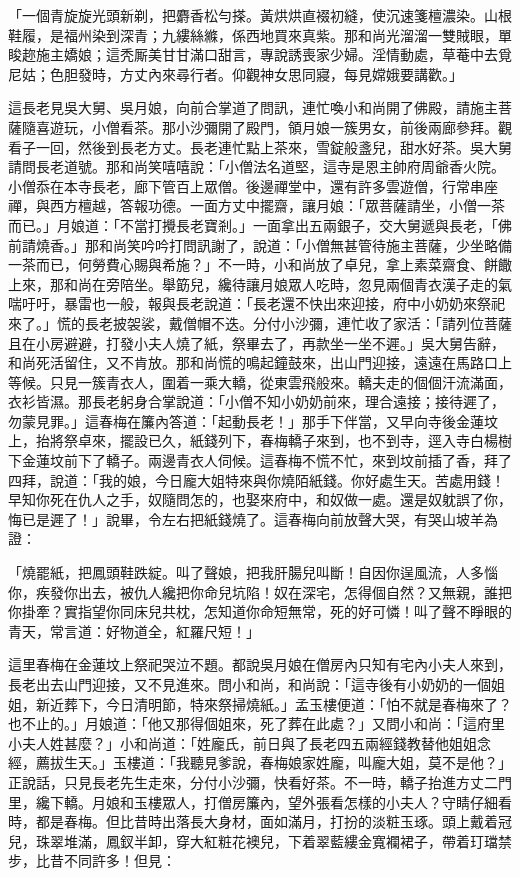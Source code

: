「一個青旋旋光頭新剃，把麝香松勻搽。黃烘烘直裰初縫，使沉速箋檀濃染。山根鞋履，是福州染到深青；九縷絲縧，係西地買來真紫。那和尚光溜溜一雙賊眼，單睃趂施主嬌娘；這秃厮美甘甘滿口甜言，專說誘喪家少婦。淫情動處，草菴中去覓尼姑；色胆發時，方丈內來尋行者。仰觀神女思同寢，每見嫦娥要講歡。」

這長老見吳大舅、吳月娘，向前合掌道了問訊，連忙喚小和尚開了佛殿，請施主菩薩隨喜遊玩，小僧看茶。那小沙彌開了殿門，領月娘一簇男女，前後兩廊參拜。觀看子一回，然後到長老方丈。長老連忙點上茶來，雪錠般盞兒，甜水好茶。吳大舅請問長老道號。那和尚笑嘻嘻說：「小僧法名道堅，這寺是恩主帥府周爺香火院。小僧忝在本寺長老，廊下管百上眾僧。後邊禪堂中，還有許多雲遊僧，行常串座禪，與西方檀越，答報功德。一面方丈中擺齋，讓月娘：「眾菩薩請坐，小僧一茶而已。」月娘道：「不當打攪長老寶剎。」一面拿出五兩銀子，交大舅遞與長老，「佛前請燒香。」那和尚笑吟吟打問訊謝了，說道：「小僧無甚管待施主菩薩，少坐略備一茶而已，何勞費心賜與希施？」不一時，小和尚放了卓兒，拿上素菜齋食、餅饊上來，那和尚在旁陪坐。舉筯兒，纔待讓月娘眾人吃時，忽見兩個青衣漢子走的氣喘吁吁，暴雷也一般，報與長老說道：「長老還不快出來迎接，府中小奶奶來祭祀來了。」慌的長老披袈裟，戴僧帽不迭。分付小沙彌，連忙收了家活：「請列位菩薩且在小房避避，打發小夫人燒了紙，祭畢去了，再款坐一坐不遲。」吳大舅告辭，和尚死活留住，又不肯放。那和尚慌的鳴起鐘鼓來，出山門迎接，遠遠在馬路口上等候。只見一簇青衣人，圍着一乘大轎，從東雲飛般來。轎夫走的個個汗流滿面，衣衫皆濕。那長老躬身合掌說道：「小僧不知小奶奶前來，理合遠接；接待遲了，勿蒙見罪。」這春梅在簾內答道：「起動長老！」那手下伴當，又早向寺後金蓮坟上，抬將祭卓來，擺設已久，紙錢列下，春梅轎子來到，也不到寺，逕入寺白楊樹下金蓮坟前下了轎子。兩邊青衣人伺候。這春梅不慌不忙，來到坟前插了香，拜了四拜，說道：「我的娘，今日龐大姐特來與你燒陌紙錢。你好處生天。苦處用錢！早知你死在仇人之手，奴隨問怎的，也娶來府中，和奴做一處。還是奴躭誤了你，悔已是遲了！」說畢，令左右把紙錢燒了。這春梅向前放聲大哭，有哭山坡羊為證：

「燒罷紙，把鳳頭鞋跌綻。叫了聲娘，把我肝腸兒叫斷！自因你逞風流，人多惱你，疾發你出去，被仇人纔把你命兒坑陷！奴在深宅，怎得個自然？又無親，誰把你掛牽？實指望你同床兒共枕，怎知道你命短無常，死的好可憐！叫了聲不睜眼的青天，常言道：好物道全，紅羅尺短！」

這里春梅在金蓮坟上祭祀哭泣不題。都說吳月娘在僧房內只知有宅內小夫人來到，長老出去山門迎接，又不見進來。問小和尚，和尚說：「這寺後有小奶奶的一個姐姐，新近葬下，今日清明節，特來祭掃燒紙。」孟玉樓便道：「怕不就是春梅來了？也不止的。」月娘道：「他又那得個姐來，死了葬在此處？」又問小和尚：「這府里小夫人姓甚麼？」小和尚道：「姓龐氏，前日與了長老四五兩經錢教替他姐姐念經，薦拔生天。」玉樓道：「我聽見爹說，春梅娘家姓龐，叫龐大姐，莫不是他？」正說話，只見長老先生走來，分付小沙彌，快看好茶。不一時，轎子抬進方丈二門里，纔下轎。月娘和玉樓眾人，打僧房簾內，望外張看怎樣的小夫人？守睛仔細看時，都是春梅。但比昔時出落長大身材，面如滿月，打扮的淡粧玉琢。頭上戴着冠兒，珠翠堆滿，鳳釵半卸，穿大紅粧花襖兒，下着翠藍縷金寬襴裙子，帶着玎璫禁步，比昔不同許多！但見：


